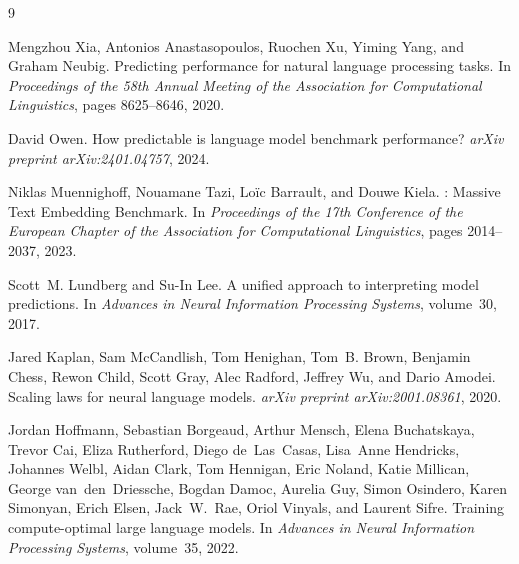 \documentclass[11pt,a4paper,twocolumn]{article}
\begin{document}
\newpage


\begin{thebibliography}{9}

Mengzhou Xia, Antonios Anastasopoulos, Ruochen Xu, Yiming Yang, and Graham Neubig.
\newblock Predicting performance for natural language processing tasks.
\newblock In \emph{Proceedings of the 58th Annual Meeting of the Association for Computational Linguistics}, pages 8625--8646, 2020.

David Owen.
\newblock How predictable is language model benchmark performance?
\newblock \emph{arXiv preprint arXiv:2401.04757}, 2024.

Niklas Muennighoff, Nouamane Tazi, Lo\"ic Barrault, and Douwe Kiela.
: Massive Text Embedding Benchmark.
\newblock In \emph{Proceedings of the 17th Conference of the European Chapter of the Association for Computational Linguistics}, pages 2014--2037, 2023.

Scott~M. Lundberg and Su-In Lee.
\newblock A unified approach to interpreting model predictions.
\newblock In \emph{Advances in Neural Information Processing Systems}, volume~30, 2017.

Jared Kaplan, Sam McCandlish, Tom Henighan, Tom~B. Brown, Benjamin Chess, Rewon Child, Scott Gray, Alec Radford, Jeffrey Wu, and Dario Amodei.
\newblock Scaling laws for neural language models.
\newblock \emph{arXiv preprint arXiv:2001.08361}, 2020.

Jordan Hoffmann, Sebastian Borgeaud, Arthur Mensch, Elena Buchatskaya, Trevor Cai, Eliza Rutherford, Diego de~Las~Casas, Lisa~Anne Hendricks, Johannes Welbl, Aidan Clark, Tom Hennigan, Eric Noland, Katie Millican, George van~den~Driessche, Bogdan Damoc, Aurelia Guy, Simon Osindero, Karen Simonyan, Erich Elsen, Jack~W.\ Rae, Oriol Vinyals, and Laurent Sifre.
\newblock Training compute-optimal large language models.
\newblock In \emph{Advances in Neural Information Processing Systems}, volume~35, 2022.

\end{thebibliography}
\end{document}
